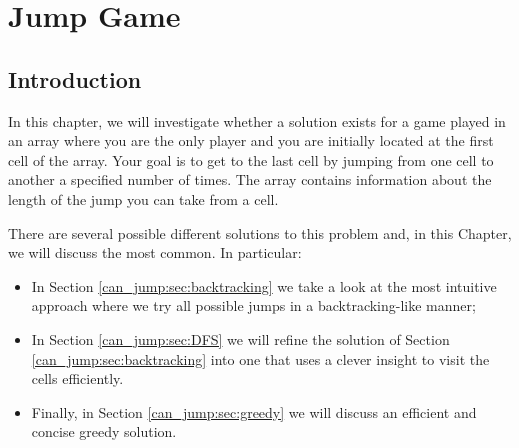 %

\chapter{Jump Game}
\label{ch:can_jump}
\section*{Introduction}
In this chapter, we will investigate whether a solution exists for a game played in an array
where you are the only player and you are initially located at the first cell of the array. Your goal is to
get to the last cell by jumping from one cell to another a specified number of times. The array contains
information about the length of the jump you can take from a cell. 

There are several possible different solutions to this problem and, in this Chapter, we will discuss the most common. 
In particular:
\begin{itemize}
    \item In Section \ref{can_jump:sec:backtracking} we take a look at the most intuitive approach where we try all possible jumps in a backtracking-like manner;
    \item In Section \ref{can_jump:sec:DFS} we will refine the solution of Section
    \ref{can_jump:sec:backtracking} into one that uses a clever insight to visit the
    cells efficiently. 
    \item Finally, in Section \ref{can_jump:sec:greedy} we will discuss an efficient and concise
    greedy solution.
\end{itemize}


